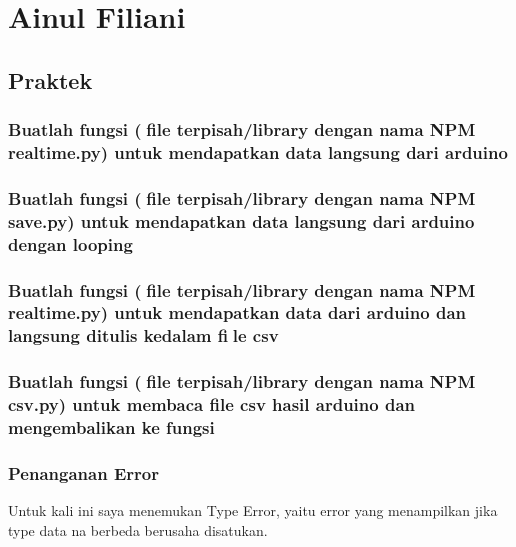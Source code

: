 \section{Ainul Filiani}
\subsection{Praktek}
\subsubsection{Buatlah fungsi (file terpisah/library dengan nama NPM realtime.py) untuk mendapatkan data langsung dari arduino}


\subsubsection{Buatlah fungsi (file terpisah/library dengan nama NPM save.py) untuk mendapatkan data langsung dari arduino dengan looping}


\subsubsection{Buatlah fungsi (file terpisah/library dengan nama NPM realtime.py) untuk mendapatkan data dari arduino dan langsung ditulis kedalam file csv}


\subsubsection{Buatlah fungsi (file terpisah/library dengan nama NPM csv.py) untuk membaca file csv hasil arduino dan mengembalikan ke fungsi}


\subsubsection{Penanganan Error}
Untuk kali ini saya menemukan Type Error, yaitu error yang menampilkan jika type data na berbeda berusaha disatukan.

